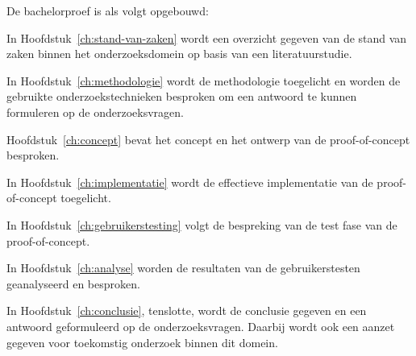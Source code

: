 De bachelorproef is als volgt opgebouwd:

In Hoofdstuk~\ref{ch:stand-van-zaken} wordt een overzicht gegeven van de stand van zaken binnen het onderzoeksdomein op basis van een literatuurstudie.

In Hoofdstuk~\ref{ch:methodologie} wordt de methodologie toegelicht en worden de gebruikte onderzoekstechnieken besproken om een antwoord te kunnen formuleren op de onderzoeksvragen.


Hoofdstuk~\ref{ch:concept} bevat het concept en het ontwerp van de proof-of-concept besproken.

In Hoofdstuk~\ref{ch:implementatie} wordt de effectieve implementatie van de proof-of-concept toegelicht.

In Hoofdstuk~\ref{ch:gebruikerstesting} volgt de bespreking van de test fase van de proof-of-concept.

In Hoofdstuk~\ref{ch:analyse} worden de resultaten van de gebruikerstesten geanalyseerd en besproken.

In Hoofdstuk~\ref{ch:conclusie}, tenslotte, wordt de conclusie gegeven en een antwoord geformuleerd op de onderzoeksvragen. Daarbij wordt ook een aanzet gegeven voor toekomstig onderzoek binnen dit domein.